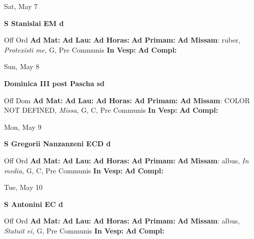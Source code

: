 \documentclass[10pt]{memoir}
\begin{document}
\begin{center}
\begin{minipage}{3.5in}
\vspace{2em}
\begin{center}Sat, May 7
\end{center}
\textbf{ \large S Stanislai EM
\textnormal{\normalsize d}}

\begin{justify}Off Ord
\textbf{Ad Mat: }
\textbf{Ad Lau: }
\textbf{Ad Horas: }
\textbf{Ad Primam: }\textbf{Ad Missam}: ruber, \textit{Protexisti me,} G, Pre Communis
\textbf{In Vesp: }
\textbf{Ad Compl: }
\end{justify}
\end{minipage}
\end{center}

\begin{center}
\begin{minipage}{3.5in}
\vspace{2em}
\begin{center}Sun, May 8
\end{center}
\textbf{ \large Dominica III post Pascha
\textnormal{\normalsize sd}}

\begin{justify}Off Dom
\textbf{Ad Mat: }
\textbf{Ad Lau: }
\textbf{Ad Horas: }
\textbf{Ad Primam: }\textbf{Ad Missam}: COLOR NOT DEFINED, \textit{Missa,} G, C, Pre Communis
\textbf{In Vesp: }
\textbf{Ad Compl: }
\end{justify}
\end{minipage}
\end{center}

\begin{center}
\begin{minipage}{3.5in}
\vspace{2em}
\begin{center}Mon, May 9
\end{center}
\textbf{ \large S Gregorii Nanzanzeni ECD
\textnormal{\normalsize d}}

\begin{justify}Off Ord
\textbf{Ad Mat: }
\textbf{Ad Lau: }
\textbf{Ad Horas: }
\textbf{Ad Primam: }\textbf{Ad Missam}: albus, \textit{In media,} G, C, Pre Communis
\textbf{In Vesp: }
\textbf{Ad Compl: }
\end{justify}
\end{minipage}
\end{center}

\begin{center}
\begin{minipage}{3.5in}
\vspace{2em}
\begin{center}Tue, May 10
\end{center}
\textbf{ \large S Antonini EC
\textnormal{\normalsize d}}

\begin{justify}Off Ord
\textbf{Ad Mat: }
\textbf{Ad Lau: }
\textbf{Ad Horas: }
\textbf{Ad Primam: }\textbf{Ad Missam}: albus, \textit{Statuit ei,} G, Pre Communis
\textbf{In Vesp: }
\textbf{Ad Compl: }
\end{justify}
\end{minipage}
\end{center}
\end{document}
